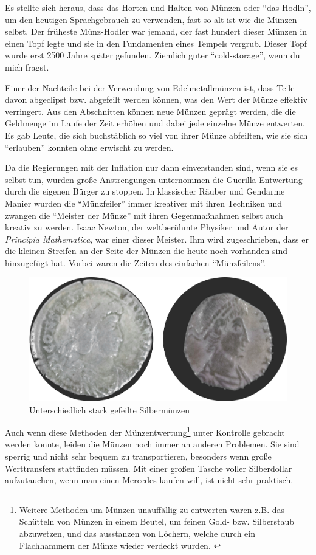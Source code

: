 Es stellte sich heraus, dass das Horten und Halten von Münzen oder “das Hodln”,
um den heutigen Sprachgebrauch zu verwenden, fast so alt ist wie die Münzen
selbst. Der früheste Münz-Hodler war jemand, der fast hundert dieser Münzen in
einen Topf legte und sie in den Fundamenten eines Tempels vergrub. Dieser Topf
wurde erst 2500 Jahre später gefunden. Ziemlich guter \enquote{cold-storage},
wenn du mich fragst.

Einer der Nachteile bei der Verwendung von Edelmetallmünzen ist, dass Teile
davon abgeclipst bzw. abgefeilt werden können, was den Wert der Münze effektiv
verringert. Aus den Abschnitten können neue Münzen geprägt werden, die die
Geldmenge im Laufe der Zeit erhöhen und dabei jede einzelne Münze entwerten. Es
gab Leute, die sich buchstäblich so viel von ihrer Münze abfeilten, wie sie sich
\enquote{erlauben} konnten ohne erwischt zu werden.

Da die Regierungen mit der Inflation nur dann einverstanden sind, wenn sie es
selbst tun, wurden große Anstrengungen unternommen die Guerilla-Entwertung durch
die eigenen Bürger zu stoppen. In klassischer Räuber und Gendarme Manier
wurden die \enquote{Münzfeiler} immer kreativer mit ihren Techniken und zwangen
die \enquote{Meister der Münze} mit ihren Gegenmaßnahmen selbst auch kreativ zu
werden. Isaac Newton, der weltberühmte Physiker und Autor der \textit{Principia
Mathematica}, war einer dieser Meister. Ihm wird zugeschrieben, dass er die
kleinen Streifen an der Seite der Münzen die heute noch vorhanden sind
hinzugefügt hat. Vorbei waren die Zeiten des einfachen \enquote{Münzfeilens}.

\begin{figure}
  \includegraphics{assets/images/clipped-coins.png}
  \caption{Unterschiedlich stark gefeilte Silbermünzen}
  \label{fig:clipped-coins}
\end{figure}

Auch wenn diese Methoden der Münzentwertung\footnote{ Weitere Methoden um Münzen
unauffällig zu entwerten waren z.B. das Schütteln von Münzen in einem Beutel, um
feinen Gold- bzw. Silberstaub abzuwetzen, und das ausstanzen von Löchern, welche
durch ein Flachhammern der Münze wieder verdeckt wurden.
\cite{wiki:coin-debasement} } unter Kontrolle gebracht werden konnte, leiden die
Münzen noch immer an anderen Problemen. Sie sind sperrig und nicht sehr bequem
zu transportieren, besonders wenn große Werttransfers stattfinden müssen. Mit
einer großen Tasche voller Silberdollar aufzutauchen, wenn man einen Mercedes
kaufen will, ist nicht sehr praktisch.

